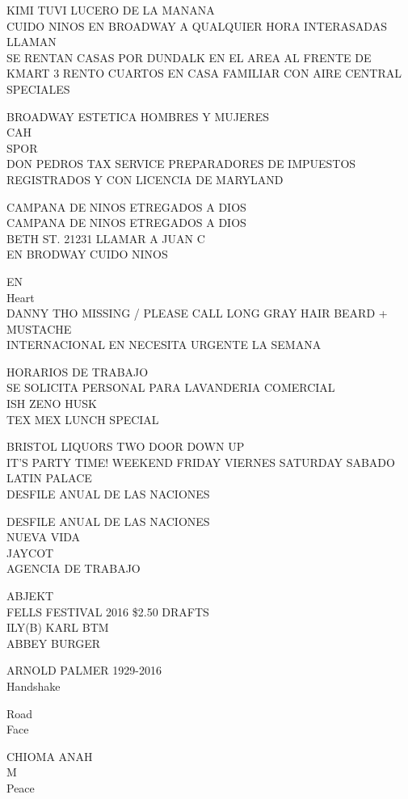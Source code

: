 \documentclass[10pt,letterpaper]{article}
\begin{document}
KIMI TUVI LUCERO DE LA MANANA\\
CUIDO NINOS EN BROADWAY A QUALQUIER HORA INTERASADAS LLAMAN\\
SE RENTAN CASAS POR DUNDALK EN EL AREA AL FRENTE DE KMART 3 RENTO CUARTOS EN CASA FAMILIAR CON AIRE CENTRAL\\
SPECIALES

BROADWAY ESTETICA HOMBRES Y MUJERES\\
CAH\\
SPOR\\
DON PEDROS TAX SERVICE PREPARADORES DE IMPUESTOS REGISTRADOS Y CON LICENCIA DE MARYLAND

CAMPANA DE NINOS ETREGADOS A DIOS\\
CAMPANA DE NINOS ETREGADOS A DIOS\\
BETH ST. 21231 LLAMAR A JUAN C\\
EN BRODWAY CUIDO NINOS

EN\\
Heart\\
DANNY THO MISSING / PLEASE CALL LONG GRAY HAIR BEARD + MUSTACHE\\
INTERNACIONAL EN NECESITA URGENTE LA SEMANA

HORARIOS DE TRABAJO\\
SE SOLICITA PERSONAL PARA LAVANDERIA COMERCIAL\\
ISH ZENO HUSK\\
TEX MEX LUNCH SPECIAL

BRISTOL LIQUORS TWO DOOR DOWN UP\\
IT'S PARTY TIME!  WEEKEND FRIDAY VIERNES SATURDAY SABADO\\
LATIN PALACE\\
DESFILE ANUAL DE LAS NACIONES

DESFILE ANUAL DE LAS NACIONES\\
NUEVA VIDA\\
JAYCOT\\
AGENCIA DE TRABAJO

ABJEKT\\
FELLS FESTIVAL 2016 \$2.50 DRAFTS\\
ILY(B) KARL BTM\\
ABBEY BURGER

ARNOLD PALMER 1929{-}2016\\
Handshake

Road\\
Face

CHIOMA ANAH\\
M\\
Peace
\end{document}

